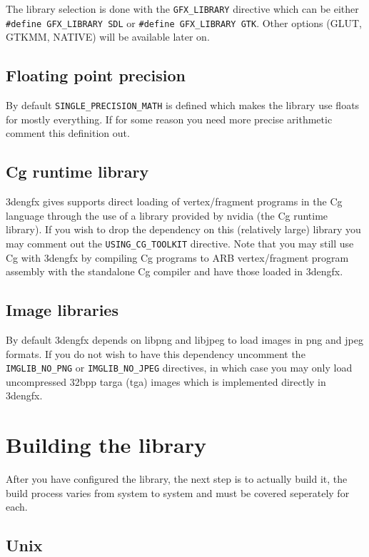 The library selection is done with the \verb|GFX_LIBRARY| directive which can be
either \verb|#define GFX_LIBRARY SDL| or \verb|#define GFX_LIBRARY GTK|. Other
options (GLUT, GTKMM, NATIVE) will be available later on.

\subsection{Floating point precision}

By default \verb|SINGLE_PRECISION_MATH| is defined which makes the library use
floats for mostly everything. If for some reason you need more precise
arithmetic comment this definition out.

\subsection{Cg runtime library}

3dengfx gives supports direct loading of vertex/fragment programs in the Cg
language through the use of a library provided by nvidia (the Cg runtime
library). If you wish to drop the dependency on this (relatively large) library
you may comment out the \verb|USING_CG_TOOLKIT| directive. Note that you may
still use Cg with 3dengfx by compiling Cg programs to ARB vertex/fragment
program assembly with the standalone Cg compiler and have those loaded in
3dengfx.

\subsection{Image libraries}

By default 3dengfx depends on libpng and libjpeg to load images in png and jpeg
formats. If you do not wish to have this dependency uncomment the
\verb|IMGLIB_NO_PNG| or \verb|IMGLIB_NO_JPEG| directives, in which case you may
only load uncompressed 32bpp targa (tga) images which is implemented directly in
3dengfx.

\section{Building the library}

After you have configured the library, the next step is to actually build it,
the build process varies from system to system and must be covered seperately
for each.

\subsection{Unix}

